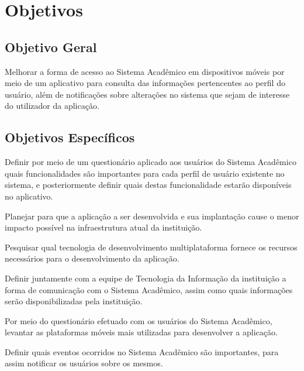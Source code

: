 \chapter{Objetivos}
\section{Objetivo Geral}
Melhorar a forma de acesso ao Sistema Acadêmico em dispositivos móveis por meio de um aplicativo para consulta das informações pertencentes ao perfil do usuário, além de notificações sobre alterações no sistema que sejam de interesse do utilizador da aplicação.

\section{Objetivos Específicos}
Definir por meio de um questionário aplicado aos usuários do Sistema Acadêmico quais funcionalidades são importantes para cada perfil de usuário existente no sistema, e posteriormente definir quais destas funcionalidade estarão disponíveis no aplicativo.

Planejar para que a aplicação a ser desenvolvida e sua implantação cause o menor impacto possível na infraestrutura atual da instituição.

Pesquisar qual tecnologia de desenvolvimento multiplataforma fornece os recursos necessários para o desenvolvimento da aplicação.

Definir juntamente com a equipe de Tecnologia da Informação da instituição a forma de comunicação com o Sistema Acadêmico, assim como quais informações serão disponibilizadas pela instituição. 

Por meio do questionário efetuado com os usuários do Sistema Acadêmico, levantar as plataformas móveis mais utilizadas para desenvolver a aplicação.

Definir quais eventos ocorridos no Sistema Acadêmico são importantes, para assim notificar os usuários sobre os mesmos. 